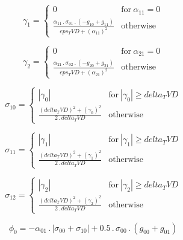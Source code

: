 \documentclass{article}
\begin{document}
\begin{dmath}\gamma_{1} = \begin{cases} 0 & \text{for}\: \alpha_{11} = 0 \\\frac{\alpha_{11} \,.\, \sigma_{0 1} \,.\, \left(- g_{10} + g_{11}\right)}{eps_TVD + \left(\alpha_{11} \right)^{2}} & \text{otherwise} \end{cases}\end{dmath}

\begin{dmath}\gamma_{2} = \begin{cases} 0 & \text{for}\: \alpha_{21} = 0 \\\frac{\alpha_{21} \,.\, \sigma_{0 2} \,.\, \left(- g_{20} + g_{21}\right)}{eps_TVD + \left(\alpha_{21} \right)^{2}} & \text{otherwise} \end{cases}\end{dmath}

\begin{dmath}\sigma_{1 0} = \begin{cases} \left|{\gamma_{0}}\right| & \text{for}\: \left|{\gamma_{0}}\right| \geq delta_TVD \\\frac{\left(delta_TVD \right)^{2} + \left(\gamma_{0} \right)^{2}}{2 \,.\, delta_TVD} & \text{otherwise} 
\end{cases}\end{dmath}

\begin{dmath}\sigma_{1 1} = \begin{cases} \left|{\gamma_{1}}\right| & \text{for}\: \left|{\gamma_{1}}\right| \geq delta_TVD \\\frac{\left(delta_TVD \right)^{2} + \left(\gamma_{1} \right)^{2}}{2 \,.\, delta_TVD} & \text{otherwise} 
\end{cases}\end{dmath}

\begin{dmath}\sigma_{1 2} = \begin{cases} \left|{\gamma_{2}}\right| & \text{for}\: \left|{\gamma_{2}}\right| \geq delta_TVD \\\frac{\left(delta_TVD \right)^{2} + \left(\gamma_{2} \right)^{2}}{2 \,.\, delta_TVD} & \text{otherwise} 
\end{cases}\end{dmath}

\begin{dmath}\phi_{0} = - \alpha_{01} \,.\, \left|{\sigma_{0 0} + \sigma_{1 0}}\right| + 0.5 \,.\, \sigma_{0 0} \,.\, \left(g_{00} + g_{01}\right)\end{dmath}
\end{document}

